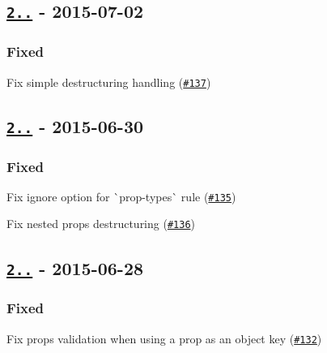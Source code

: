 \subsection*{\href{https://github.com/yannickcr/eslint-plugin-react/compare/v2.6.3...v2.6.4}{\tt 2..} -\/ 2015-\/07-\/02}

\subsubsection*{Fixed}


\begin{DoxyItemize}
\item Fix simple destructuring handling (\href{https://github.com/yannickcr/eslint-plugin-react/issues/137}{\tt \#137})
\end{DoxyItemize}

\subsection*{\href{https://github.com/yannickcr/eslint-plugin-react/compare/v2.6.2...v2.6.3}{\tt 2..} -\/ 2015-\/06-\/30}

\subsubsection*{Fixed}


\begin{DoxyItemize}
\item Fix ignore option for \`{}prop-\/types\`{} rule (\href{https://github.com/yannickcr/eslint-plugin-react/issues/135}{\tt \#135})
\item Fix nested props destructuring (\href{https://github.com/yannickcr/eslint-plugin-react/issues/136}{\tt \#136})
\end{DoxyItemize}

\subsection*{\href{https://github.com/yannickcr/eslint-plugin-react/compare/v2.6.1...v2.6.2}{\tt 2..} -\/ 2015-\/06-\/28}

\subsubsection*{Fixed}


\begin{DoxyItemize}
\item Fix props validation when using a prop as an object key (\href{https://github.com/yannickcr/eslint-plugin-react/issues/132}{\tt \#132})
\end{DoxyItemize}

